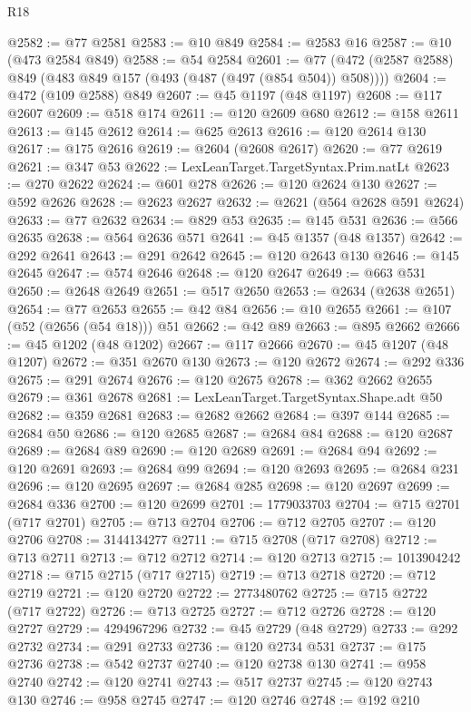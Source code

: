 \begin{lexlean}{R18}
\begin{coremodule}
@2582 := @77 @2581
@2583 := @10 @849
@2584 := @2583 @16
@2587 := @10 (@473 @2584 @849)
@2588 := @54 @2584
@2601 := @77 (@472 (@2587 @2588) @849 (@483 @849 @157 (@493 (@487 (@497 (@854 @504)) @508))))
@2604 := @472 (@109 @2588) @849
@2607 := @45 @1197 (@48 @1197)
@2608 := @117 @2607
@2609 := @518 @174
@2611 := @120 @2609 @680
@2612 := @158 @2611
@2613 := @145 @2612
@2614 := @625 @2613
@2616 := @120 @2614 @130
@2617 := @175 @2616
@2619 := @2604 (@2608 @2617)
@2620 := @77 @2619
@2621 := @347 @53
@2622 := LexLeanTarget.TargetSyntax.Prim.natLt
@2623 := @270 @2622
@2624 := @601 @278
@2626 := @120 @2624 @130
@2627 := @592 @2626
@2628 := @2623 @2627
@2632 := @2621 (@564 @2628 @591 @2624)
@2633 := @77 @2632
@2634 := @829 @53
@2635 := @145 @531
@2636 := @566 @2635
@2638 := @564 @2636 @571
@2641 := @45 @1357 (@48 @1357)
@2642 := @292 @2641
@2643 := @291 @2642
@2645 := @120 @2643 @130
@2646 := @145 @2645
@2647 := @574 @2646
@2648 := @120 @2647
@2649 := @663 @531
@2650 := @2648 @2649
@2651 := @517 @2650
@2653 := @2634 (@2638 @2651)
@2654 := @77 @2653
@2655 := @42 @84
@2656 := @10 @2655
@2661 := @107 (@52 (@2656 (@54 @18))) @51
@2662 := @42 @89
@2663 := @895 @2662
@2666 := @45 @1202 (@48 @1202)
@2667 := @117 @2666
@2670 := @45 @1207 (@48 @1207)
@2672 := @351 @2670 @130
@2673 := @120 @2672
@2674 := @292 @336
@2675 := @291 @2674
@2676 := @120 @2675
@2678 := @362 @2662 @2655
@2679 := @361 @2678
@2681 := LexLeanTarget.TargetSyntax.Shape.adt @50
@2682 := @359 @2681
@2683 := @2682 @2662
@2684 := @397 @144
@2685 := @2684 @50
@2686 := @120 @2685
@2687 := @2684 @84
@2688 := @120 @2687
@2689 := @2684 @89
@2690 := @120 @2689
@2691 := @2684 @94
@2692 := @120 @2691
@2693 := @2684 @99
@2694 := @120 @2693
@2695 := @2684 @231
@2696 := @120 @2695
@2697 := @2684 @285
@2698 := @120 @2697
@2699 := @2684 @336
@2700 := @120 @2699
@2701 := 1779033703
@2704 := @715 @2701 (@717 @2701)
@2705 := @713 @2704
@2706 := @712 @2705
@2707 := @120 @2706
@2708 := 3144134277
@2711 := @715 @2708 (@717 @2708)
@2712 := @713 @2711
@2713 := @712 @2712
@2714 := @120 @2713
@2715 := 1013904242
@2718 := @715 @2715 (@717 @2715)
@2719 := @713 @2718
@2720 := @712 @2719
@2721 := @120 @2720
@2722 := 2773480762
@2725 := @715 @2722 (@717 @2722)
@2726 := @713 @2725
@2727 := @712 @2726
@2728 := @120 @2727
@2729 := 4294967296
@2732 := @45 @2729 (@48 @2729)
@2733 := @292 @2732
@2734 := @291 @2733
@2736 := @120 @2734 @531
@2737 := @175 @2736
@2738 := @542 @2737
@2740 := @120 @2738 @130
@2741 := @958 @2740
@2742 := @120 @2741
@2743 := @517 @2737
@2745 := @120 @2743 @130
@2746 := @958 @2745
@2747 := @120 @2746
@2748 := @192 @210

\end{coremodule}
\end{lexlean}
